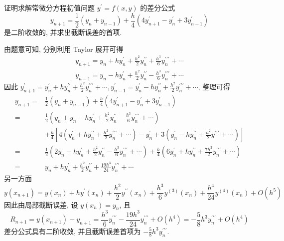  
    \begin{tcolorbox}[enhanced,colback=8,colframe=7,breakable,coltitle=green!25!black,title=2024]
 证明求解常微分方程初值问题 $ y^{\prime}=f(x, y) $ 的差分公式
$$
y_{n+1}=\frac{1}{2}\left(y_{n}+y_{n-1}\right)+\frac{h}{4}\left(4 y_{n+1}^{\prime}-y_{n}^{\prime}+3 y_{n-1}^{\prime}\right)
$$
是二阶收敛的, 并求出截断误差的首项.
 \tcblower

 由题意可知, 分别利用 Taylor 展开可得
$$
\begin{array}{l}
y_{n+1}=y_{n}+h y_{n}^{\prime}+\frac{h^{2}}{2} y_{n}^{\prime \prime}+\frac{h^{3}}{6} y_{n}^{\prime \prime \prime}+\cdots \\
y_{n-1}=y_{n}-h y_{n}^{\prime}+\frac{h^{2}}{2} y_{n}^{\prime \prime}-\frac{h^{3}}{6} y_{n}^{\prime \prime \prime}+\cdots
\end{array}
$$
因此 $ y_{n+1}^{\prime}=y_{n}^{\prime}+h y_{n}^{\prime \prime}+\frac{h^{2}}{2} y_{n}^{\prime \prime \prime}+\cdots, y_{n-1}^{\prime}=y_{n}^{\prime}-h y_{n}^{\prime \prime}+\frac{h^{2}}{2} y_{n}^{\prime \prime \prime}+\cdots $, 整理可得
$$
\begin{aligned}
y_{n+1}=&\frac{1}{2}\left(y_{n}+y_{n-1}\right)+\frac{h}{4}\left(4 y_{n+1}^{\prime}-y_{n}^{\prime}+3 y_{n-1}^{\prime}\right)\\
= & \frac{1}{2}\left(y_{n}+y_{n}-h y_{n}^{\prime}+\frac{h^{2}}{2} y_{n}^{\prime \prime}-\frac{h^{3}}{6} y_{n}^{\prime \prime \prime}+\cdots\right) \\
& +\frac{h}{4}\left[4\left(y_{n}^{\prime}+h y_{n}^{\prime \prime}+\frac{h^{2}}{2} y_{n}^{\prime \prime \prime}+\cdots\right)-y_{n}^{\prime}+3\left(y_{n}^{\prime}-h y_{n}^{\prime \prime}+\frac{h^{2}}{2} y^{\prime \prime \prime}+\cdots\right)\right] \\
= & \frac{1}{2}\left(2 y_{n}-h y_{n}^{\prime}+\frac{h^{2}}{2} y_{n}^{\prime \prime}-\frac{h^{3}}{6} y_{n}^{\prime \prime \prime}+\cdots\right)+\frac{h}{4}\left(6 y_{n}^{\prime}+h y_{n}^{\prime \prime}+\frac{7 h^{2}}{2} y_{n}^{\prime \prime \prime}+\cdots\right) \\
= & y_{n}+h y_{n}^{\prime}+\frac{h^{2}}{2} y_{n}^{\prime \prime}+\frac{19 h^{3}}{24} y_{n}^{\prime \prime \prime}+\cdots
\end{aligned}
$$
另一方面
$$
y\left(x_{n+1}\right)=y\left(x_{n}\right)+h y^{\prime}\left(x_{n}\right)+\frac{h^{2}}{2} y^{\prime \prime}\left(x_{n}\right)+\frac{h^{3}}{6} y^{(3)}\left(x_{n}\right)+\frac{h^{4}}{24} y^{(4)}\left(x_{n}\right)+O\left(h^{5}\right)
$$
因此由局部截断误差, 设 $ y\left(x_{n}\right)=y_{n} $, 且
$$
R_{n+1}=y\left(x_{n+1}\right)-y_{n+1}=\frac{h^{3}}{6} y_{n}^{\prime \prime \prime}-\frac{19 h^{3}}{24} y_{n}^{\prime \prime \prime}+O\left(h^{4}\right)=-\frac{5}{8} h^{3} y_{n}^{\prime \prime \prime}+O\left(h^{4}\right)
$$
差分公式具有二阶收敛, 并且截断误差首项为 $ -\frac{5}{8} h^{3} y_{n}^{\prime \prime \prime} $.
 \end{tcolorbox}


